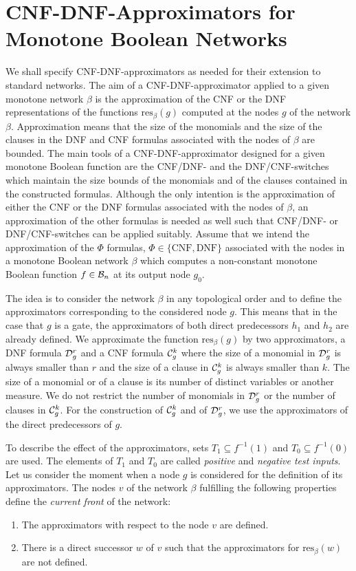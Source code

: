 \documentclass[11pt]{article}
\begin{document}
\section{CNF-DNF-Approximators for Monotone Boole\-an Networks}

We shall specify CNF-DNF-approximators as needed for their extension to standard networks.
The aim of a CNF-DNF-approximator applied to a given monotone network $\beta$ is the approximation of the
CNF or the DNF representations of the functions $\mbox{res}_{\beta}(g)$ computed at the nodes $g$ of the network
$\beta$. Approximation means that the size of the monomials and the size of the clauses in the DNF and CNF formulas
associated with the nodes of $\beta$ are bounded. The main tools of a CNF-DNF-approximator designed for a given monotone
Boolean function are the CNF/DNF- and the DNF/CNF-switches which maintain the size bounds of the monomials and of the
clauses contained in the constructed formulas. Although the only intention is the approximation of either the CNF or the
DNF formulas associated with the nodes of $\beta$, an approximation of the other formulas is needed as well such that
CNF/DNF- or DNF/CNF-switches can be applied suitably. Assume that we intend the approximation of the $\Phi$ formulas,
$\Phi \in \{\mbox{CNF}, \mbox{DNF}\}$ associated with the nodes in a monotone Boolean network $\beta$ which computes a
non-constant monotone Boolean function $f \in {\cal B}_n$ at its output node $g_0$.

The idea is to consider the network $\beta$ in any topological order and to define the approximators corresponding to
the considered node $g$. This means that in the case that $g$ is a gate, the approximators of both direct predecessors
$h_1$ and $h_2$ are already defined. We approximate the function $\mbox{res}_{\beta}(g)$ by two approximators,
a DNF formula ${\cal D}_g^r$ and a CNF formula ${\cal C}_g^k$ where the size of a monomial in ${\cal D}_g^r$ is
always smaller than $r$ and the size of a clause in ${\cal C}_g^k$ is always smaller than $k$. 
The size of a monomial or of a clause is its number of distinct variables or another measure.
We do not restrict the number of monomials in ${\cal D}_g^r$ or the number of clauses in ${\cal C}_g^k$.
For the construction of ${\cal C}_g^k$ and of ${\cal D}_g^r$, we use the approximators of the direct predecessors of $g$.

To describe the effect of the approximators, sets $T_1 \subseteq f^{-1}(1)$ and $T_0 \subseteq f^{-1}(0)$ are
used. The elements of $T_1$ and $T_0$ are called {\em positive\/} and {\em negative test inputs\/}.
Let us consider the moment when a node $g$ is considered for the definition of its approximators. The nodes $v$ of
the network $\beta$ fulfilling the following properties define the {\em current front\/} of the network:
\begin{enumerate}
\item
  The approximators with respect to the node $v$ are defined.
\item
  There is a direct successor $w$ of $v$ such that the approximators for $\mbox{res}_{\beta}(w)$ are not defined.
\end{enumerate}
\end{document}
